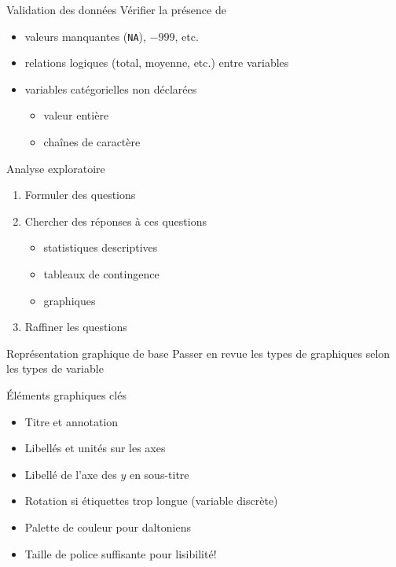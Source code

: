 \documentclass[
  ignorenonframetext,
]{beamer}
\providecommand{\tightlist}{%
  \setlength{\itemsep}{0pt}\setlength{\parskip}{0pt}}\usepackage{longtable,booktabs,array}
\begin{document}
\begin{frame}[fragile]{Validation des données}
\protect\hypertarget{validation-des-donnuxe9es}{}
Vérifier la présence de

\begin{itemize}
\tightlist
\item
  valeurs manquantes (\texttt{NA}), \(-999\), etc.
\item
  relations logiques (total, moyenne, etc.) entre variables
\item
  variables catégorielles non déclarées

  \begin{itemize}
  \tightlist
  \item
    valeur entière
  \item
    chaînes de caractère
  \end{itemize}
\end{itemize}
\end{frame}

\begin{frame}{Analyse exploratoire}
\protect\hypertarget{analyse-exploratoire}{}
\begin{enumerate}
\tightlist
\item
  Formuler des questions
\item
  Chercher des réponses à ces questions

  \begin{itemize}
  \tightlist
  \item
    statistiques descriptives
  \item
    tableaux de contingence
  \item
    graphiques
  \end{itemize}
\item
  Raffiner les questions
\end{enumerate}
\end{frame}

\begin{frame}{Représentation graphique de base}
\protect\hypertarget{repruxe9sentation-graphique-de-base}{}
Passer en revue les types de graphiques selon les types de variable
\end{frame}

\begin{frame}{Éléments graphiques clés}
\protect\hypertarget{uxe9luxe9ments-graphiques-cluxe9s}{}
\begin{itemize}
\tightlist
\item
  Titre et annotation
\item
  Libellés et unités sur les axes
\item
  Libellé de l'axe des \(y\) en sous-titre
\item
  Rotation si étiquettes trop longue (variable discrète)
\item
  Palette de couleur pour daltoniens
\item
  Taille de police suffisante pour lisibilité!
\end{itemize}
\end{frame}
\end{document}
